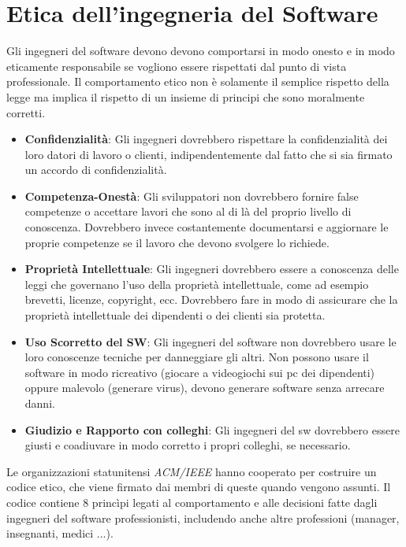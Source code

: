 \documentclass[a4paper, 10pt]{article}
\begin{document}
	\section{Etica dell'ingegneria del Software}
		Gli ingegneri del software devono devono comportarsi in modo onesto e in modo eticamente responsabile se vogliono essere rispettati dal punto di vista professionale. Il comportamento etico non è solamente il semplice rispetto della legge ma implica il rispetto di un insieme di principi che sono moralmente corretti.
		\begin{itemize}
			\item \textbf{Confidenzialità}: Gli ingegneri dovrebbero rispettare la confidenzialità dei loro datori di lavoro o clienti, indipendentemente dal fatto che si sia firmato un accordo di confidenzialità.
			\item \textbf{Competenza-Onestà}: Gli sviluppatori non dovrebbero fornire false competenze o accettare lavori che sono al di là del proprio livello di conoscenza. Dovrebbero invece costantemente documentarsi e aggiornare le proprie competenze se il lavoro che devono svolgere lo richiede.
			\item \textbf{Proprietà Intellettuale}: Gli ingegneri dovrebbero essere a conoscenza delle leggi che governano l'uso della proprietà intellettuale, come ad esempio brevetti, licenze, copyright, ecc. Dovrebbero fare in modo di assicurare che la proprietà intellettuale dei dipendenti o dei clienti sia protetta.
			\item \textbf{Uso Scorretto del SW}: Gli ingegneri del software non dovrebbero usare le loro conoscenze tecniche per danneggiare gli altri. Non possono usare il software in modo ricreativo (giocare a videogiochi sui pc dei dipendenti) oppure malevolo (generare virus), devono generare software senza arrecare danni. 
			\item \textbf{Giudizio e Rapporto con colleghi}: Gli ingegneri del sw dovrebbero essere giusti e coadiuvare in modo corretto i propri colleghi, se necessario.
		\end{itemize}
		 Le organizzazioni statunitensi \textit{ACM/IEEE} hanno cooperato per costruire un codice etico, che viene firmato dai membri di queste quando vengono assunti. Il codice contiene 8 princìpi legati al comportamento e alle decisioni fatte dagli ingegneri del software professionisti, includendo anche altre professioni (manager, insegnanti, medici ...).
		 
\end{document}
